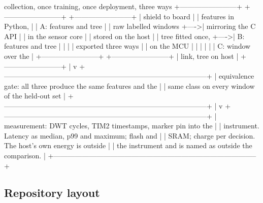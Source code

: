 \begin{asciiart}
  collection, once               training, once                 deployment, three ways
  +------------------------+     +------------------------+     +------------------------+
  | shield to board        |     | features in Python,    |     | A: features and tree   |
  |   raw labelled windows +---->|   mirroring the C API  |     |    in the sensor core  |
  |   stored on the host   |     | tree fitted once,      +---->| B: features and tree   |
  |                        |     | exported three ways    |     |    on the MCU          |
  |                        |     |                        |     | C: window over the     |
  +------------------------+     +------------------------+     |    link, tree on host  |
                                                                +------------------------+
                                              |
                                              v
  +--------------------------------------------------------------------------------------+
  | equivalence gate: all three produce the same features and the                        |
  |   same class on every window of the held-out set                                     |
  +--------------------------------------------------------------------------------------+
                                              |
                                              v
  +--------------------------------------------------------------------------------------+
  | measurement: DWT cycles, TIM2 timestamps, marker pin into the                        |
  |   instrument. Latency as median, p99 and maximum; flash and                          |
  |   SRAM; charge per decision. The host's own energy is outside                        |
  |   the instrument and is named as outside the comparison.                             |
  +--------------------------------------------------------------------------------------+
\end{asciiart}

\subsection*{Repository layout}

